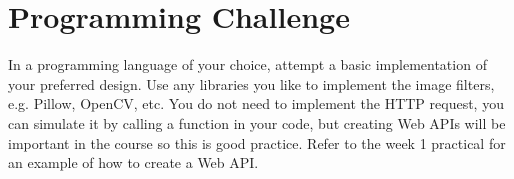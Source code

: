 \documentclass{csse4400}
\begin{document}
\section{Programming Challenge}
In a programming language of your choice,
attempt a basic implementation of your preferred design.
Use any libraries you like to implement the image filters, e.g. Pillow, OpenCV, etc.
You do not need to implement the HTTP request, you can simulate it by calling a function in your code,
but creating Web APIs will be important in the course so this is good practice.
Refer to the week 1 practical \cite{prac-week1} for an example of how to create a Web API.




\end{document}
